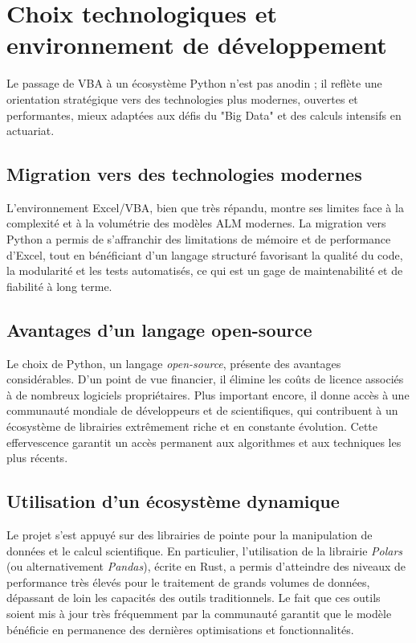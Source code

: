 \section{Choix technologiques et environnement de développement}

Le passage de VBA à un écosystème Python n'est pas anodin ; il reflète une orientation stratégique vers des technologies plus modernes, ouvertes et performantes, mieux adaptées aux défis du "Big Data" et des calculs intensifs en actuariat.

\subsection{Migration vers des technologies modernes}
L'environnement Excel/VBA, bien que très répandu, montre ses limites face à la complexité et à la volumétrie des modèles ALM modernes. La migration vers Python a permis de s'affranchir des limitations de mémoire et de performance d'Excel, tout en bénéficiant d'un langage structuré favorisant la qualité du code, la modularité et les tests automatisés, ce qui est un gage de maintenabilité et de fiabilité à long terme.

\subsection{Avantages d'un langage open-source}
Le choix de Python, un langage \textit{open-source}, présente des avantages considérables. D'un point de vue financier, il élimine les coûts de licence associés à de nombreux logiciels propriétaires. Plus important encore, il donne accès à une communauté mondiale de développeurs et de scientifiques, qui contribuent à un écosystème de librairies extrêmement riche et en constante évolution. Cette effervescence garantit un accès permanent aux algorithmes et aux techniques les plus récents.

\subsection{Utilisation d'un écosystème dynamique}
Le projet s'est appuyé sur des librairies de pointe pour la manipulation de données et le calcul scientifique. En particulier, l'utilisation de la librairie \textit{Polars} (ou alternativement \textit{Pandas}), écrite en Rust, a permis d'atteindre des niveaux de performance très élevés pour le traitement de grands volumes de données, dépassant de loin les capacités des outils traditionnels. Le fait que ces outils soient mis à jour très fréquemment par la communauté garantit que le modèle bénéficie en permanence des dernières optimisations et fonctionnalités.


